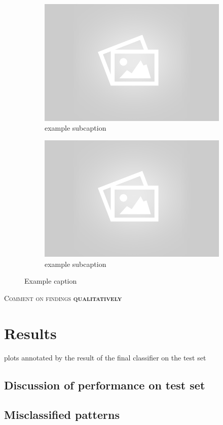 \begin{figure}[!ht]
\begin{subfigure}[b]{.45\textwidth}
	\label{fig:subfigure2}
	\end{subfigure}
	\begin{subfigure}[b]{.45\textwidth}
	\centering
	\includegraphics[width=\textwidth]{mlp/placeholder.png}
	\caption{example subcaption}
	\end{subfigure}
	\quad
	\begin{subfigure}[b]{.45\textwidth}
	\centering
	\includegraphics[width=\textwidth]{mlp/placeholder.png}
	\caption{example subcaption}
	\label{fig:subfigure2}
	\end{subfigure}
	\caption{Example caption}
	\label{fig:example}
\end{figure}

\textsc{Comment on findings \textbf{qualitatively}}		

\section{Results}
	plots annotated by the result of the final classifier on the test set
	\subsection{Discussion of performance on test set}

	\subsection{Misclassified patterns}